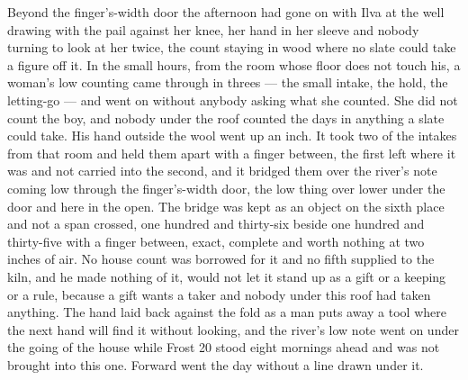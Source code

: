 Beyond the finger's-width door the afternoon had gone on with Ilva at the well drawing with the pail against her knee, her hand in her sleeve and nobody turning to look at her twice, the count staying in wood where no slate could take a figure off it. In the small hours, from the room whose floor does not touch his, a woman's low counting came through in threes --- the small intake, the hold, the letting-go --- and went on without anybody asking what she counted. She did not count the boy, and nobody under the roof counted the days in anything a slate could take. His hand outside the wool went up an inch. It took two of the intakes from that room and held them apart with a finger between, the first left where it was and not carried into the second, and it bridged them over the river's note coming low through the finger's-width door, the low thing over lower under the door and here in the open. The bridge was kept as an object on the sixth place and not a span crossed, one hundred and thirty-six beside one hundred and thirty-five with a finger between, exact, complete and worth nothing at two inches of air. No house count was borrowed for it and no fifth supplied to the kiln, and he made nothing of it, would not let it stand up as a gift or a keeping or a rule, because a gift wants a taker and nobody under this roof had taken anything. The hand laid back against the fold as a man puts away a tool where the next hand will find it without looking, and the river's low note went on under the going of the house while Frost 20 stood eight mornings ahead and was not brought into this one. Forward went the day without a line drawn under it.
